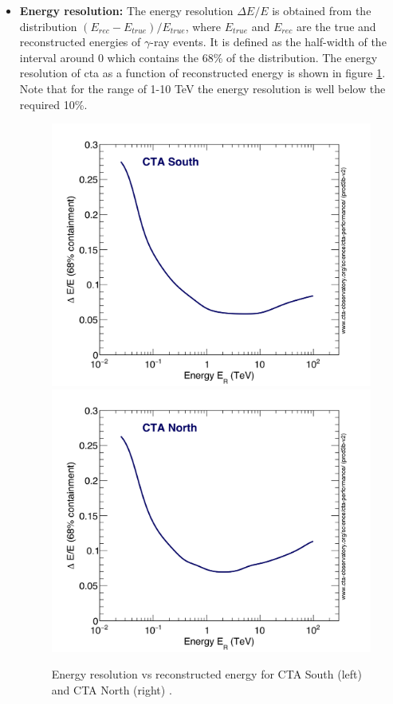 \documentclass[main.tex]{subfiles}
\begin{document}
\begin{itemize}
\item \textbf{Energy resolution:} The energy resolution $\Delta E/E$ is obtained from the distribution $(E_{rec}-E_{true})/E_{true}$, where $E_{true}$ and $E_{rec}$ are the true and reconstructed energies of $\gamma$-ray events. It is defined as the half-width of the interval around 0 which contains the 68\% of the distribution. The energy resolution of \gls{cta} as a function of reconstructed energy is shown in figure \ref{fig:energyres}. Note that for the range of 1-10 TeV the energy resolution is well below the required 10\%.

  \begin{figure}[!htb]
    \includegraphics[width=\linewidth]{Pictures/CTA-Performance-prod3b-v2-South-20deg-EnergyResolution.pdf}
    \endminipage\hfill
    \includegraphics[width=\linewidth]{Pictures/CTA-Performance-prod3b-v2-North-20deg-EnergyResolution.pdf}
    \endminipage\hfill
    \caption{\label{fig:energyres} Energy resolution vs reconstructed energy for CTA South (left) and CTA North (right) \cite{CTAPerformance}.}
  \end{figure}


\end{itemize}
\end{document}

